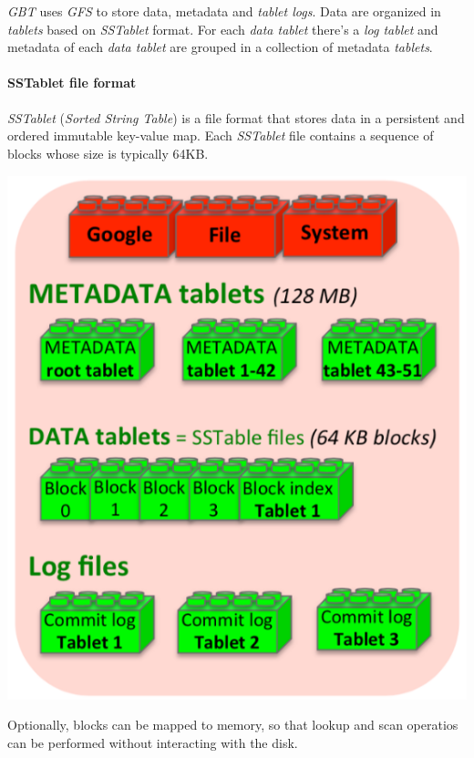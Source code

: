 \noindent\begin{minipage}[c]{0.7\textwidth}
    \emph{GBT} uses \emph{GFS} to store data, metadata and \emph{tablet logs}.
    Data are organized in \emph{tablets} based on \emph{SSTablet} format. For
    each \emph{data tablet} there's a \emph{log tablet} and metadata of each
    \emph{data tablet} are grouped in a collection of metadata \emph{tablets}.

    \paragraph{SSTablet file format}
    \emph{SSTablet} (\emph{Sorted String Table}) is a file format that stores
    data in a persistent and ordered immutable key-value map. Each \emph{SSTablet}
    file contains a sequence of blocks whose size is typically 64KB.
\end{minipage}\hfill
\begin{minipage}[c]{0.28\textwidth}
    \centering
    \includegraphics[width=\textwidth]{images/gbt-blocks1.png}
\end{minipage}

\noindent
Optionally, blocks can be mapped to memory, so that lookup and scan operatios
can be performed without interacting with the disk.


